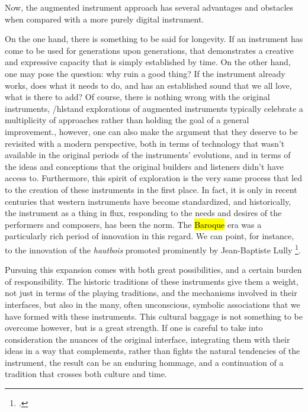 \documentclass[12pt,twoside,maitrise]{dms_ks}
\theoremstyle{definition}
\begin{document}
{%

Now, the augmented instrument approach has several advantages and obstacles when compared with a more purely digital instrument. 

On the one hand, there is something to be said for longevity.
If an instrument has come to be used for generations upon generations, that demonstrates a creative and expressive capacity that is simply established by time.
On the other hand, one may pose the question: why ruin a good thing?
If the instrument already works, does what it needs to do, and has an established sound that we all love, what is there to add?
Of course, there is nothing wrong with the original instruments, /hlst{and explorations of augmented instruments typically celebrate a multiplicity of approaches rather than holding the goal of a general improvement.}, however, one can also make the argument that they deserve to be revisited with a modern perspective, both in terms of technology that wasn't available in the original periods of the instruments' evolutions, and in terms of the ideas and conceptions that the original builders and listeners didn't have access to. 
Furthermore, this spirit of exploration is the very same process that led to the creation of these instruments in the first place.
In fact, it is only in recent centuries that western instruments have become standardized, and historically, the instrument as a thing in flux, responding to the needs and desires of the performers and composers, has been the norm.
The \hl{Baroque} era was a particularly rich period of innovation in this regard.
We can point, for instance, to the innovation of the \textit{hautbois} promoted prominently by Jean-Baptiste Lully \footcite{wainwright_renaissance_2017}.


Pursuing this expansion comes with both great possibilities, and a certain burden of responsibility.
The historic traditions of these instruments give them a weight, not just in terms of the playing traditions, and the mechanisms involved in their interfaces, but also in the many, often unconscious, symbolic associations that we have formed with these instruments.
This cultural baggage is not something to be overcome however, but is a great strength.
If one is careful to take into consideration the nuances of the original interface, integrating them with their ideas in a way that complements, rather than fights the natural tendencies of the instrument, the result can be an enduring hommage, and a continuation of a tradition that crosses both culture and time.

}
\end{document}
